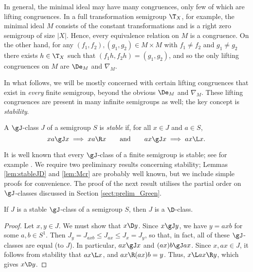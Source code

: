 In general, the minimal ideal may have many congruences, only few of which are lifting congruences. 
In a full transformation
semigroup $\T_X$, for example, the minimal ideal $M$ consists of the
constant transformations and is a right zero semigroup of size $|X|$. Hence, every
equivalence relation on $M$ is a congruence. On the other hand, for any $(f_1,
f_2), (g_1,g_2)\in M \times M$ with $f_1\not = f_2$ and $g_1 \not =g_2$  
there exists $h\in \T_X$ such that $(f_1h, f_2h) = (g_1,g_2)$, and so 
the only lifting congruences on $M$ are $\De_M$ and $\nabla_M$. %

In what follows, we will be mostly concerned with certain lifting congruences
that exist in \emph{every} finite semigroup, beyond the obvious $\De_M$ and
$\nabla_M$.  These lifting congruences are present in many infinite semigroups as well; the key concept is \emph{stability}.

\begin{definition}\label{defn:stableJ}
A $\gJ$-class $J$ of a semigroup $S$ is \emph{stable} if, for all $x\in J$ and $a\in S$,
\[
xa\gJ x \implies xa\R x \qquad\text{and}\qquad ax\gJ x \implies ax\L x.
\]
\end{definition}

It is well known that every $\gJ$-class of a finite semigroup is stable; see for example \cite[Theorem A.2.4]{RSbook}.  We require two preliminary results concerning stability; Lemmas \ref{lem:stableJD} and \ref{lem:Mcr} are probably well known, but we include simple proofs for convenience.  The proof of the next result utilises the partial order on $\gJ$-classes discussed in Section \ref{sect:prelim_Green}.

\begin{lemma}\label{lem:stableJD}
If $J$ is a stable $\gJ$-class of a semigroup $S$, then $J$ is a $\D$-class.
\end{lemma}

\begin{proof}
Let $x,y\in J$.  We must show that $x\D y$.  Since $x\gJ y$, we have $y=axb$ for some $a,b\in S^1$.  Then $J_y = J_{axb} \leq J_{ax} \leq J_x = J_y$, so that, in fact, all of these $\gJ$-classes are equal (to $J$).  In particular, $ax\gJ x$ and $(ax)b\gJ ax$.  Since $x,ax\in J$, it follows from stability that $ax\L x$, and $ax \R (ax)b=y$.  Thus, $x\L ax\R y$, which gives $x\D y$.
\end{proof}

